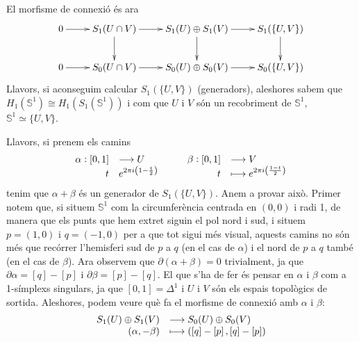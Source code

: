 \documentclass[../main.tex]{subfiles}
\begin{document}
El morfisme de connexió és ara
\begin{equation}
    \notag
    \xymatrix{
    0 \ar[r] & S_1(U\cap V)\ar[r]\ar[d] & S_1(U)\oplus S_1(V)\ar[r]\ar[d] & S_1(\{U,V\})\ar[d]\\
    0 \ar[r] & S_0(U\cap V)\ar[r] & S_0(U)\oplus S_0(V)\ar[r] & S_0(\{U,V\})
    }
\end{equation}
Llavors, si aconseguim calcular $S_1(\{U,V\})$ (generadors), aleshores sabem que $H_1(\mathbb{S}^1)\cong H_1(S_1(\mathbb{S}^1))$ i com que $U$ i $V$ són un recobriment de $\mathbb{S}^1$, $\mathbb{S}^1\simeq \{U,V\}$. 

Llavors, si prenem els camins
\begin{equation}
    \notag
    \begin{array}{rl}
        \alpha:\left[0,1\right] & \longrightarrow U \\
        t & e^{2\pi i\left(1-\frac{t}{2}\right)}
    \end{array}\qquad
    \begin{array}{rl}
        \beta:\left[0,1\right] & \longrightarrow V \\
        t & \longmapsto e^{2\pi i\left(\frac{1-t}{2}\right)}
    \end{array}
\end{equation}
tenim que $\alpha+\beta$ és un generador de $S_1(\{U,V\})$. Anem a provar això. Primer notem que, si situem $\mathbb{S}^1$ com la circumferència centrada en $(0,0)$ i radi 1, de manera que els punts que hem extret siguin el pol nord i sud, i situem $p = (1,0)$ i $q = (-1,0)$ per a que tot sigui més visual, aquests camins no són més que recórrer l'hemisferi sud de $p$ a $q$ (en el cas de $\alpha$) i el nord de $p$ a $q$ també (en el cas de $\beta$). Ara observem que $\partial(\alpha+\beta) = 0$ trivialment, ja que $\partial\alpha = [q]-[p]$ i $\partial\beta = [p]-[q]$. El que s'ha de fer és pensar en $\alpha$ i $\beta$ com a 1-símplexs singulars, ja que $[0,1] = \Delta^1$ i $U$ i $V$ són els espais topològics de sortida. Aleshores, podem veure què fa el morfisme de connexió amb $\alpha$ i $\beta$:
\begin{equation}
    \notag
    \begin{array}{rl}
        S_1(U)\oplus S_1(V) & \longrightarrow S_0(U)\oplus S_0(V) \\
        (\alpha,-\beta) & \longmapsto (\left[q\right]-\left[p\right], \left[q\right]-\left[p\right])
    \end{array}
\end{equation}
\end{document}
